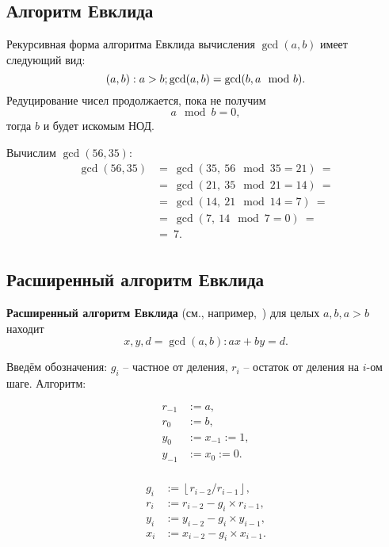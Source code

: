 \subsection{Алгоритм Евклида}

Рекурсивная форма алгоритма Евклида вычисления $\gcd(a,b)$ имеет следующий вид:
    \[\mathbb{(}a,b): a>b;  \gcd(a,b) = \gcd(b, a \mod b). \]
Редуцирование чисел продолжается, пока не получим
    \[ a \mod b = 0, \]
тогда $b$ и будет искомым НОД.

\example
Вычислим $\gcd(56, 35)$:
\[ \begin{array}{ll}
    \gcd(56, 35) & =~ \gcd(35, ~ 56 \mod 35 = 21) ~= \\
    & =~ \gcd(21, ~ 35 \mod 21 = 14) ~= \\
    & =~ \gcd(14, ~ 21 \mod 14 = 7) ~= \\
    & =~ \gcd(7, ~ 14 \mod 7 = 0) ~= \\
    & =~ 7. \\
\end{array} \]
\exampleend


\subsection{Расширенный алгоритм Евклида}

\textbf{Расширенный алгоритм Евклида} (см., например,~\cite[8.8 Наибольшие общие делители и алгоритм Евклида]{Aho:1979}) для целых $a, b, a > b$ находит
    \[ x, y, d = \gcd(a,b): ax + by = d. \]

Введём обозначения: $g_i$ -- частное от деления, $r_i$ -- остаток от деления на $i$-ом шаге. Алгоритм:

\[\begin{array}{ll}
	r_{-1} & := a, \\
	r_0 & := b, \\
	y_0 & := x_{-1} := 1, \\
	y_{-1} & := x_0 := 0. \\
\end{array}\]

\[\begin{array}{ll}
	g_i & := \left\lfloor r_{i-2} / r_{i-1} \right\rfloor, \\
	r_i & := r_{i-2} - g_i \times r_{i-1}, \\
	y_i & := y_{i-2} - g_i \times y_{i-1} , \\
	x_i & := x_{i-2} - g_i \times x_{i-1} . \\
\end{array}\]

